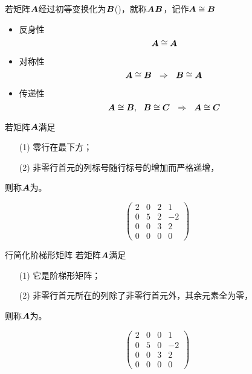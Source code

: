 \begin{frame}
\begin{dingyi}[矩阵的相抵]
  若矩阵$\boldsymbol{A}$经过初等变换化为$\boldsymbol{B}$()，就称$\boldsymbol{A}$$\boldsymbol{B}$，记作$\boldsymbol{A}\cong\boldsymbol{B}$
\end{dingyi}

\begin{xingzhi}[相抵关系的性质]
  \begin{itemize}
  \item 反身性
    $$
    \boldsymbol{A}\cong\boldsymbol{A}
    $$
  \item 对称性
    $$
    \boldsymbol{A}\cong\boldsymbol{B} ~~\Rightarrow~~ \boldsymbol{B}\cong\boldsymbol{A}
    $$
  \item 传递性
    $$
    \boldsymbol{A}\cong\boldsymbol{B},~~\boldsymbol{B}\cong\boldsymbol{C} ~~\Rightarrow~~ \boldsymbol{A}\cong\boldsymbol{C}
    $$
  \end{itemize}
\end{xingzhi}
\end{frame}

\begin{frame}
\begin{dingyi}[阶梯形矩阵]
  若矩阵$\boldsymbol{A}$满足
  \begin{itemize}
  \item[(1)] 零行在最下方；
  \item[(2)] 非零行首元的列标号随行标号的增加而严格递增，
  \end{itemize}
  则称$\boldsymbol{A}$为。
\end{dingyi}

\begin{li}
  $$
  \left(
    \begin{array}{rrrr}
      2&0&2&1\\
      0&5&2&-2\\
      0&0&3&2\\
      0&0&0&0
    \end{array}
  \right)
  $$
\end{li}
\end{frame}

\begin{frame}
\begin{dingyi}{行简化阶梯形矩阵}
  若矩阵$\boldsymbol{A}$满足
  \begin{itemize}
  \item[(1)] 它是阶梯形矩阵；
  \item[(2)] 非零行首元所在的列除了非零行首元外，其余元素全为零，
  \end{itemize}
  则称$\boldsymbol{A}$为。
\end{dingyi}

\begin{li}
  $$
  \left(
    \begin{array}{rrrr}
      2&0&0&1\\
      0&5&0&-2\\
      0&0&3&2\\
      0&0&0&0
    \end{array}
  \right)
  $$
\end{li}
\end{frame}


